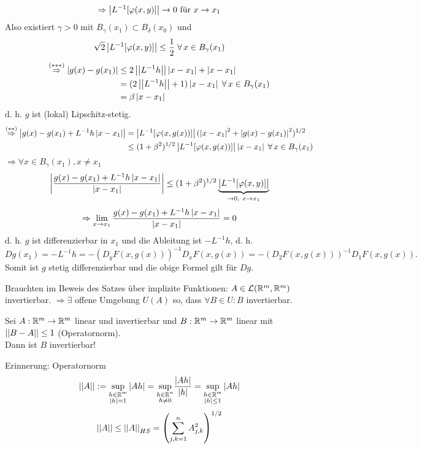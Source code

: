 \documentclass[../ana2.tex]{subfiles}
\begin{document}
\begin{bew}
    \[ \Rightarrow \left| L^{-1}[\varphi(x,y)] \right| \rightarrow 0 \text{ für } x \rightarrow x_1 \]
    Also existiert \( \gamma > 0 \) mit \( B_\gamma(x_1) \subset 
    B_\delta(x_0) \) und 
    \[ \sqrt{2} \abs{L^{-1}[\varphi(x,y)]} \leq \frac{1}{2} 
    \;\forall x \in B_\gamma(x_1) \]
    \begin{align*}
        \overset{(***)}{\Rightarrow} 
        \abs{ g(x) - g(x_1) } &\leq 2 \norm{ L^{-1}h }\abs{x - x_1} 
        + \abs{x - x_1} \\
        &= (2 \norm{L^{-1} h} + 1)\abs{x-x_1} \;\forall x \in B_\gamma(x_1) \\
        &= \beta\abs{x - x_1}
    \end{align*}
    d. h. \(g\) ist (lokal) Lipschitz-stetig.
    \begin{align*}
        \overset{(**)}{\Rightarrow} \abs{ g(x) - g(x_1) + L^{-1}h \abs{x - x_1} } 
        &= \abs{ L^{-1}[\varphi(x,g(x))] } (\abs{ x - x_1 }^2 + \abs{ g(x) - g(x_1) }^2)^{1/2} \\
        &\leq (1 + \beta^2)^{1/2} \abs{ L^{-1}[\varphi(x, g(x))] } \abs{x - x_1} 
        \;\forall x \in B_\gamma(x_1)
    \end{align*}
    \( \Rightarrow \forall x \in B_\gamma(x_1), x \neq x_1 \)
    \[ \left|\frac{g(x)-g(x_1)+ L^{-1}h\left|x-x_1\right|}{\left|x-x_1\right|}\right|  \leq (1+\beta^2)^{1/2} 
    \underbrace{\left|L^{-1}[\varphi(x,y)]\right| }_{\rightarrow 0,\ x \rightarrow x_1} \]
    \[ \Rightarrow \lim\limits_{x\rightarrow{}x_1} \frac{g(x)-g(x_1)+L^{-1}h\left|x-x_1\right|}{\left|x-x_1\right|} = 0 \]
    d. h. \(g\) ist differenzierbar in \(x_1\) und die Ableitung 
    ist \( -L^{-1}h \), d. h. 
    \[ Dg(x_1) = -L^{-1}h = -(D_y F(x,g(x)) )^{-1} D_x F(x,g(x))
    = -(D_2 F(x,g(x)))^{-1}D_1 F(x, g(x)). \]
    Somit ist \(g\) stetig differenzierbar und die obige Formel gilt für \(Dg\).
\end{bew}
Brauchten im Beweis des Satzes über implizite Funktionen:
\( A \in \mathcal{L}(\mathbb{R}^m, \mathbb{R}^m) \) invertierbar. 
\( \Rightarrow \exists \) offene Umgebung \( U(A) \)
so, dass \( \forall B \in U: B \) invertierbar.
\begin{lem}
    Sei \( A:\mathbb{R}^m\rightarrow \mathbb{R}^m \) linear und invertierbar und 
    \( B:\mathbb{R}^m\rightarrow \mathbb{R}^m \) linear mit \(\left|\left|B-A\right|\right| \leq 1\) (Operatornorm). \\
    Dann ist \( B \) invertierbar!
\end{lem}
\begin{bem}
    Erinnerung: Operatornorm \(   \)
    \[\left|\left|A\right|\right| := \underset{\substack{h \in \mathbb{R}^m \\ \left|h\right| = 1}}{\sup} \left|A h\right| 
    = \underset{\substack{h \in \mathbb{R}^n \\ h \neq 0}}{\sup} \frac{ \left|Ah\right| }{\left|h\right|}
    = \underset{\substack{h \in \mathbb{R}^m \\ \left|h\right| \leq 1}}{\sup} \left|A h\right| \]
    \[ \left|\left|A\right|\right| \leq \left|\left|A\right|\right|_{HS} 
    = \left( \sum_{j,k = 1}^n A_{j,k}^2 \right)^{1/2} \]
\end{bem}
\end{document}
